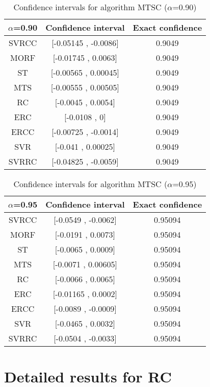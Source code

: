 \documentclass[a4paper,10pt]{article}
\begin{document}
\begin{table}[!htp]
\centering\small
\begin{tabular}{
|c|c|c|}
\hline
 $\alpha$=0.90 & Confidence interval & Exact confidence \\ \hline 
SVRCC & [-0.05145 , -0.0086] & 0.9049\\ \hline 
MORF & [-0.01745 , 0.0063] & 0.9049\\ \hline 
ST & [-0.00565 , 0.00045] & 0.9049\\ \hline 
MTS & [-0.00555 , 0.00505] & 0.9049\\ \hline 
RC & [-0.0045 , 0.0054] & 0.9049\\ \hline 
ERC & [-0.0108 , 0] & 0.9049\\ \hline 
ERCC & [-0.00725 , -0.0014] & 0.9049\\ \hline 
SVR & [-0.041 , 0.00025] & 0.9049\\ \hline 
SVRRC & [-0.04825 , -0.0059] & 0.9049\\ \hline 

\end{tabular}
\caption{Confidence intervals for algorithm MTSC ($\alpha$=0.90)}
\end{table}
\begin{table}[!htp]
\centering\small
\begin{tabular}{
|c|c|c|}
\hline
 $\alpha$=0.95 & Confidence interval & Exact confidence \\ \hline 
SVRCC & [-0.0549 , -0.0062] & 0.95094\\ \hline 
MORF & [-0.0191 , 0.0073] & 0.95094\\ \hline 
ST & [-0.0065 , 0.0009] & 0.95094\\ \hline 
MTS & [-0.0071 , 0.00605] & 0.95094\\ \hline 
RC & [-0.0066 , 0.0065] & 0.95094\\ \hline 
ERC & [-0.01165 , 0.0002] & 0.95094\\ \hline 
ERCC & [-0.0089 , -0.0009] & 0.95094\\ \hline 
SVR & [-0.0465 , 0.0032] & 0.95094\\ \hline 
SVRRC & [-0.0504 , -0.0033] & 0.95094\\ \hline 

\end{tabular}
\caption{Confidence intervals for algorithm MTSC ($\alpha$=0.95)}
\end{table}

 \clearpage 


\section{Detailed results for RC}
\end{document}
